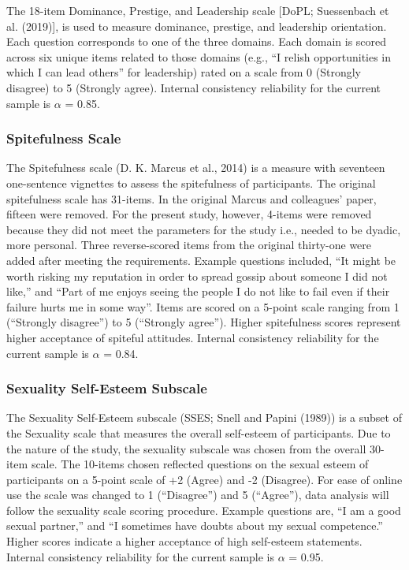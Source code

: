 \documentclass[
  donotrepeattitle,doc, 12pt, a4paper,floatsintext]{apa7}
\begin{document}
The 18-item Dominance, Prestige, and Leadership scale {[}DoPL; Suessenbach et al. (2019){]}, is used to measure dominance, prestige, and leadership orientation. Each question corresponds to one of the three domains. Each domain is scored across six unique items related to those domains (e.g., ``I relish opportunities in which I can lead others'' for leadership) rated on a scale from 0 (Strongly disagree) to 5 (Strongly agree). Internal consistency reliability for the current sample is \(\alpha\) = 0.85.

\hypertarget{spitefulness-scale}{%
\subsubsection{Spitefulness Scale}\label{spitefulness-scale}}

The Spitefulness scale (D. K. Marcus et al., 2014) is a measure with seventeen one-sentence vignettes to assess the spitefulness of participants. The original spitefulness scale has 31-items. In the original Marcus and colleagues' paper, fifteen were removed. For the present study, however, 4-items were removed because they did not meet the parameters for the study i.e., needed to be dyadic, more personal. Three reverse-scored items from the original thirty-one were added after meeting the requirements. Example questions included, ``It might be worth risking my reputation in order to spread gossip about someone I did not like,'' and ``Part of me enjoys seeing the people I do not like to fail even if their failure hurts me in some way''. Items are scored on a 5-point scale ranging from 1 (``Strongly disagree'') to 5 (``Strongly agree''). Higher spitefulness scores represent higher acceptance of spiteful attitudes. Internal consistency reliability for the current sample is \(\alpha\) = 0.84.

\hypertarget{sexuality-self-esteem-subscale}{%
\subsubsection{Sexuality Self-Esteem Subscale}\label{sexuality-self-esteem-subscale}}

The Sexuality Self-Esteem subscale (SSES; Snell and Papini (1989)) is a subset of the Sexuality scale that measures the overall self-esteem of participants. Due to the nature of the study, the sexuality subscale was chosen from the overall 30-item scale. The 10-items chosen reflected questions on the sexual esteem of participants on a 5-point scale of +2 (Agree) and -2 (Disagree). For ease of online use the scale was changed to 1 (``Disagree'') and 5 (``Agree''), data analysis will follow the sexuality scale scoring procedure. Example questions are, ``I am a good sexual partner,'' and ``I sometimes have doubts about my sexual competence.'' Higher scores indicate a higher acceptance of high self-esteem statements. Internal consistency reliability for the current sample is \(\alpha\) = 0.95.
\end{document}
